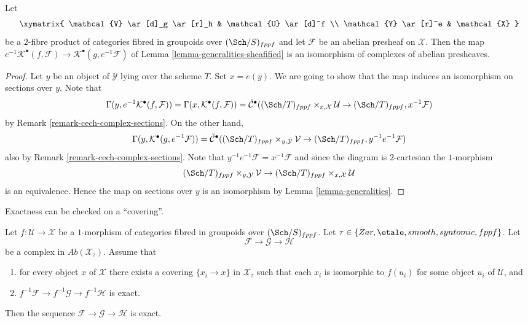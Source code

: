 \begin{lemma}
\label{lemma-base-change-cech-complex}
Let
$$
\xymatrix{
\mathcal{V} \ar[d]_g \ar[r]_h & \mathcal{U} \ar[d]^f \\
\mathcal{Y} \ar[r]^e & \mathcal{X}
}
$$
be a $2$-fibre product of categories fibred in groupoids over
$(\Sch/S)_{fppf}$ and let $\mathcal{F}$ be an abelian presheaf
on $\mathcal{X}$. Then the map
$e^{-1}\mathcal{K}^\bullet(f, \mathcal{F}) \to
\mathcal{K}^\bullet(g, e^{-1}\mathcal{F})$
of
Lemma \ref{lemma-generalities-sheafified}
is an isomorphism of complexes of abelian presheaves.
\end{lemma}

\begin{proof}
Let $y$ be an object of $\mathcal{Y}$ lying over the scheme $T$.
Set $x = e(y)$. We are going to show that the map induces an isomorphism
on sections over $y$. Note that
$$
\Gamma(y, e^{-1}\mathcal{K}^\bullet(f, \mathcal{F})) =
\Gamma(x, \mathcal{K}^\bullet(f, \mathcal{F})) =
\check{\mathcal{C}}^\bullet(
(\Sch/T)_{fppf} \times_{x, \mathcal{X}} \mathcal{U} \to
(\Sch/T)_{fppf}, x^{-1}\mathcal{F})
$$
by
Remark \ref{remark-cech-complex-sections}. On the other hand,
$$
\Gamma(y, \mathcal{K}^\bullet(g, e^{-1}\mathcal{F})) =
\check{\mathcal{C}}^\bullet(
(\Sch/T)_{fppf} \times_{y, \mathcal{Y}} \mathcal{V} \to
(\Sch/T)_{fppf}, y^{-1}e^{-1}\mathcal{F})
$$
also by
Remark \ref{remark-cech-complex-sections}.
Note that $y^{-1}e^{-1}\mathcal{F} = x^{-1}\mathcal{F}$
and since the diagram is $2$-cartesian the $1$-morphism
$$
(\Sch/T)_{fppf} \times_{y, \mathcal{Y}} \mathcal{V} \to
(\Sch/T)_{fppf} \times_{x, \mathcal{X}} \mathcal{U}
$$
is an equivalence. Hence the map on sections over $y$ is an
isomorphism by
Lemma \ref{lemma-generalities}.
\end{proof}

\noindent
Exactness can be checked on a ``covering''.

\begin{lemma}
\label{lemma-check-exactness-covering}
Let $f : \mathcal{U} \to \mathcal{X}$ be a $1$-morphism of categories fibred
in groupoids over $(\Sch/S)_{fppf}$. Let
$\tau \in \{Zar, \etale, smooth, syntomic, fppf\}$.
Let
$$
\mathcal{F} \to \mathcal{G} \to \mathcal{H}
$$
be a complex in $\textit{Ab}(\mathcal{X}_\tau)$. Assume that
\begin{enumerate}
\item for every object $x$ of $\mathcal{X}$ there exists a covering
$\{x_i \to x\}$ in $\mathcal{X}_\tau$ such that each $x_i$ is isomorphic
to $f(u_i)$ for some object $u_i$ of $\mathcal{U}$, and
\item $f^{-1}\mathcal{F} \to f^{-1}\mathcal{G} \to f^{-1}\mathcal{H}$ is exact.
\end{enumerate}
Then the sequence $\mathcal{F} \to \mathcal{G} \to \mathcal{H}$
is exact.
\end{lemma}

